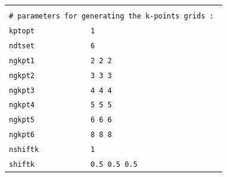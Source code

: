 \documentclass[11pt,a4paper]{article}
\begin{document}
\begin{center}
\begin{tabular}{lll}
&&\\
\multicolumn{3}{l}{\texttt{\# parameters for generating the k-points grids : }}\\
\texttt{kptopt} & \texttt{1} &\\
\texttt{ndtset} & \texttt{6}&\\
\texttt{ngkpt1} & \texttt{2 2 2}&\\
\texttt{ngkpt2} & \texttt{3 3 3}&\\
\texttt{ngkpt3} & \texttt{4 4 4}&\\
\texttt{ngkpt4} & \texttt{5 5 5}&\\
\texttt{ngkpt5} & \texttt{6 6 6}&\\
\texttt{ngkpt6} & \texttt{8 8 8}&\\
\texttt{nshiftk} &\texttt{1}&\\
\texttt{shiftk} &\texttt{0.5 0.5 0.5}&
\end{tabular}
\end{center} 
\newpage
\end{document}
